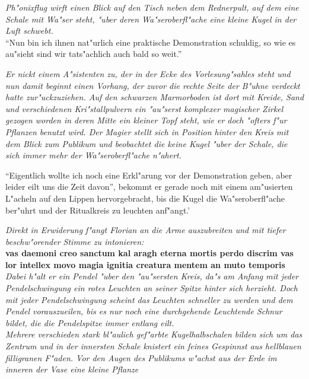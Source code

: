 \documentclass[a5paper,8pt]{book}
\begin{document}
\textit{Ph"onixflug wirft einen Blick auf den Tisch neben dem Rednerpult, auf dem eine Schale mit Wa"ser steht, "uber deren Wa"seroberfl"ache eine kleine Kugel in der Luft schwebt.}\\

``Nun bin ich ihnen nat"urlich eine praktische Demonstration schuldig, so wie es au"sieht sind wir tats"achlich auch bald so weit.''

\textit{Er nickt einem A"sistenten zu, der in der Ecke des Vorlesung"sahles steht und nun damit beginnt einen Vorhang, der zuvor die rechte Seite der B"uhne verdeckt hatte zur"uckzuziehen. Auf den schwarzen Marmorboden ist dort mit Kreide, Sand und verschiedenen Kri"stallpulvern ein "au"serst komplexer magischer Zirkel gezogen worden in deren Mitte ein kleiner Topf steht, wie er doch "ofters f"ur Pflanzen benutzt wird.
Der Magier stellt sich in Position hinter den Kreis mit dem Blick zum Publikum und beobachtet die keine Kugel "uber der Schale, die sich immer mehr der Wa"seroberfl"ache n"ahert.}

``Eigentlich wollte ich noch eine Erkl"arung vor der Demonstration geben, aber leider eilt uns die Zeit davon'', bekommt er gerade noch mit einem am"usierten L"acheln auf den Lippen hervorgebracht, bis die Kugel die Wa"seroberfl"ache ber"uhrt und der Ritualkreis zu leuchten anf"angt.'

\textit{Direkt in Erwiderung f"angt Florian an die Arme auszubreiten und mit tiefer beschw"orender Stimme zu intonieren:}\\

\textbf{vas daemoni creo sanctum kal aragh eterna mortis perdo discrim vas lor intellex movo magia ignitia creatura mentem an muto temporis}\\

\textit{Dabei h"alt er ein Pendel "uber den "au"sersten Kreis, da"s am Anfang mit jeder Pendelschwingung ein rotes Leuchten an seiner Spitze hinter sich herzieht. Doch mit jeder Pendelschwingung scheint das Leuchten schneller zu werden und dem Pendel vorauszueilen, bis es nur noch eine durchgehende Leuchtende Schnur bildet, die die Pendelspitze immer entlang eilt.}\\

\textit{Mehrere verschieden stark bl"aulich gef"arbte Kugelhalbschalen bilden sich um das Zentrum und in der innersten Schale knistert ein feines Gespinnst aus hellblauen filligranen F"aden. Vor den Augen des Publikums w"achst aus der Erde im inneren der Vase eine kleine Pflanze}\\
\end{document}
